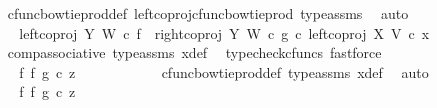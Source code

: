 \begin{isabellebody}
\ \ \ \ \ \ \ \ \ \ \isamarkupfalse%
\ cfunc{\isacharunderscore}{\kern0pt}bowtie{\isacharunderscore}{\kern0pt}prod{\isacharunderscore}{\kern0pt}def{}\ left{\isacharunderscore}{\kern0pt}coproj{\isacharunderscore}{\kern0pt}cfunc{\isacharunderscore}{\kern0pt}bowtie{\isacharunderscore}{\kern0pt}prod\ type{\isacharunderscore}{\kern0pt}assms\ \isamarkupfalse%
\ auto\isanewline
\ \ \ \ \ \ \ \ \isamarkupfalse%
\ \isamarkupfalse%
\ {\isachardoublequoteopen}{\isachardot}{\kern0pt}{\isachardot}{\kern0pt}{\isachardot}{\kern0pt}\ {\isacharequal}{\kern0pt}\ {\isacharparenleft}{\kern0pt}{\isacharparenleft}{\kern0pt}left{\isacharunderscore}{\kern0pt}coproj\ Y\ W\ {\isasymcirc}\isactrlsub c\ f{\isacharparenright}{\kern0pt}\ {\isasymamalg}\ {\isacharparenleft}{\kern0pt}right{\isacharunderscore}{\kern0pt}coproj\ Y\ W\ {\isasymcirc}\isactrlsub c\ g{\isacharparenright}{\kern0pt}{\isacharparenright}{\kern0pt}\ {\isasymcirc}\isactrlsub c\ left{\isacharunderscore}{\kern0pt}coproj\ X\ V\ {\isasymcirc}\isactrlsub c\ x{}{\isachardoublequoteclose}\isanewline
\ \ \ \ \ \ \ \ \ \ \isamarkupfalse%
\ comp{\isacharunderscore}{\kern0pt}associative{}\ type{\isacharunderscore}{\kern0pt}assms\ x{}{\isacharunderscore}{\kern0pt}def\ \isamarkupfalse%
\ {\isacharparenleft}{\kern0pt}typecheck{\isacharunderscore}{\kern0pt}cfuncs{\isacharcomma}{\kern0pt}\ fastforce{\isacharparenright}{\kern0pt}\isanewline
\ \ \ \ \ \ \ \ \isamarkupfalse%
\ \isamarkupfalse%
\ {\isachardoublequoteopen}{\isachardot}{\kern0pt}{\isachardot}{\kern0pt}{\isachardot}{\kern0pt}\ {\isacharequal}{\kern0pt}\ {\isacharparenleft}{\kern0pt}f\ {\isasymbowtie}\isactrlsub f\ g{\isacharparenright}{\kern0pt}\ {\isasymcirc}\isactrlsub c\ z{}{\isachardoublequoteclose}\isanewline
\ \ \ \ \ \ \ \ \ \ \isamarkupfalse%
\ cfunc{\isacharunderscore}{\kern0pt}bowtie{\isacharunderscore}{\kern0pt}prod{\isacharunderscore}{\kern0pt}def{}\ type{\isacharunderscore}{\kern0pt}assms\ x{}{\isacharunderscore}{\kern0pt}def\ \isamarkupfalse%
\ auto\isanewline
\ \ \ \ \ \ \ \ \isamarkupfalse%
\ \isamarkupfalse%
\ {\isachardoublequoteopen}{\isachardot}{\kern0pt}{\isachardot}{\kern0pt}{\isachardot}{\kern0pt}\ {\isacharequal}{\kern0pt}\ {\isacharparenleft}{\kern0pt}f\ {\isasymbowtie}\isactrlsub f\ g{\isacharparenright}{\kern0pt}\ {\isasymcirc}\isactrlsub c\ z{}{\isachardoublequoteclose}\isanewline

\end{isabellebody}
